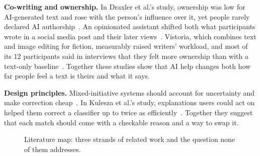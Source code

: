 \documentclass[11pt,a4paper]{article}
\begin{document}
\textbf{Co-writing and ownership.} In Draxler et al.'s study, ownership was low
for AI-generated text and rose with the person's influence over it, yet people
rarely declared AI authorship~\cite{draxler_ai_2024}. An opinionated assistant
shifted both what participants wrote in a social media post and their later
views~\cite{jakesch_co-writing_2023}. Vistoria, which combines text and image
editing for fiction, measurably raised writers' workload, and most of its 12
participants said in interviews that they felt more ownership than with a
text-only baseline~\cite{fu_vistoria_2026-1}. Together these studies show
that AI help changes both how far people feel a text is theirs and what it
says.

\textbf{Design principles.} Mixed-initiative systems should account for
uncertainty and make correction cheap~\cite{horvitz_principles_1999}. In Kulesza
et al.'s study, explanations users could act on helped them correct a classifier
up to twice as efficiently~\cite{kulesza_principles_2015}. Together they suggest
that each match should come with a checkable reason and a way to swap it.

\begin{figure}[!hb]
\centering
{}
\caption{Literature map: three strands of related work and the question none of them addresses.}
\label{fig:map}
\end{figure}
\end{document}
